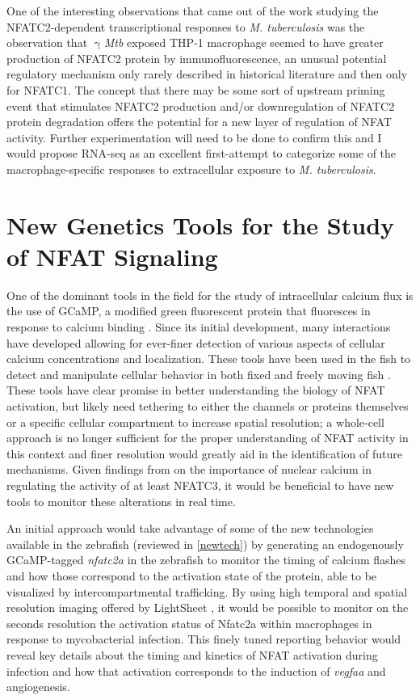 One of the interesting observations that came out of the work studying the NFATC2-dependent transcriptional responses to \textit{M. tuberculosis} was the observation that $\upgamma$\textit{Mtb} exposed THP-1 macrophage seemed to have greater production of NFATC2 protein by immunofluorescence, an unusual potential regulatory mechanism only rarely described in historical literature \citep{Asagiri2005, Aramburu1995} and then only for NFATC1. The concept that there may be some sort of upstream priming event that stimulates NFATC2 production and/or downregulation of NFATC2 protein degradation offers the potential for a new layer of regulation of NFAT activity. Further experimentation will need to be done to confirm this and I would propose RNA-seq as an excellent first-attempt to categorize some of the macrophage-specific responses to extracellular exposure to \textit{M. tuberculosis}. 

\section{New Genetics Tools for the Study of NFAT Signaling}

One of the dominant tools in the field for the study of intracellular calcium flux is the use of GCaMP, a modified green fluorescent protein that fluoresces in response to calcium binding \citep{Nakai2001}. Since its initial development, many interactions have developed allowing for ever-finer detection of various aspects of cellular calcium concentrations and localization. These tools have been used in the fish to detect and manipulate cellular behavior in both fixed and freely moving fish \citep{Beerman2015, Kim2017}. These tools have clear promise in better understanding the biology of NFAT activation, but likely need tethering to either the channels or proteins themselves or a specific cellular compartment to increase spatial resolution; a whole-cell approach is no longer sufficient for the proper understanding of NFAT activity in this context and finer resolution would greatly aid in the identification of future mechanisms. Given findings from \citet{Kar2015} on the importance of nuclear calcium in regulating the activity of at least NFATC3, it would be beneficial to have new tools to monitor these alterations in real time. 

An initial approach would take advantage of some of the new technologies available in the zebrafish (reviewed in \autoref{newtech}) by generating an endogenously GCaMP-tagged \textit{nfatc2a} in the zebrafish to monitor the timing of calcium flashes and how those correspond to the activation state of the protein, able to be visualized by intercompartmental trafficking. By using high temporal and spatial resolution imaging offered by LightSheet \citep{Reynaud2008}, it would be possible to monitor on the seconds resolution the activation status of Nfatc2a within macrophages in response to mycobacterial infection. This finely tuned reporting behavior would reveal key details about the timing and kinetics of NFAT activation during infection and how that activation corresponds to the induction of \textit{vegfaa} and angiogenesis.

